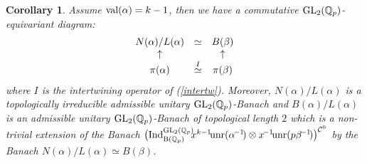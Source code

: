 \documentclass[11pt]{amsart}
\def\Q{{\mathbb Q}_p}
\def\G{{\rm GL}_2(\Q)}
\def\B{{\rm B}(\Q)}
\newtheorem{cor}[definit]{\bf{Corollary}}
\begin{document}
\begin{cor}\label{bon} 
Assume ${\rm val}(\alpha)=k-1$, then we have a commutative
$\G$-equivariant diagram: 
$$\begin{matrix}N(\alpha)/L(\alpha)&\simeq &B(\beta)\\ \uparrow
  &&\uparrow \\ \pi(\alpha)& \buildrel I\over\simeq
  &\pi(\beta)\end{matrix}$$  
where $I$ is the intertwining operator of (\ref{intertw}). 
Moreover, $N(\alpha)/L(\alpha)$ is a topologically irreducible
  admissible unitary $\G$-Banach and $B(\alpha)/L(\alpha)$ is an
  admissible unitary $\G$-Banach of topological length $2$ which is a
  non-trivial extension of the Banach $\big({\rm
  Ind}_{\B}^{\G}\!\!x^{k-1}\!{\rm unr}(\alpha^{\!-1}\!)\otimes
  x^{\!-1}\!{\rm unr}(p\beta^{\!-1}\!)\big)^{{\mathcal C}^0}$ by the
  Banach $N(\alpha)/L(\alpha)\simeq B(\beta)$.  
\end{cor} 
\end{document}
